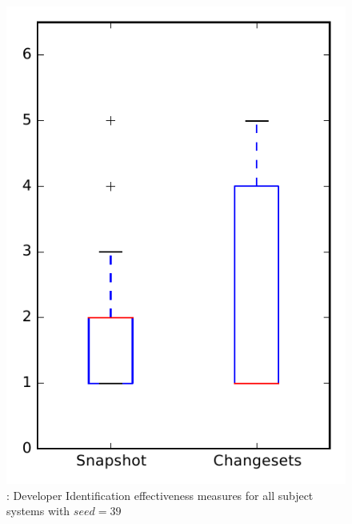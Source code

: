 
\begin{figure}
\centering
\includegraphics[height=0.4\textheight]{figures/dit_seed/rq1_overview_39}
\caption{\rtwo: Developer Identification effectiveness measures for all subject systems with $seed=39$}
\label{fig:dit_seed:rq1:overview}
\end{figure}

